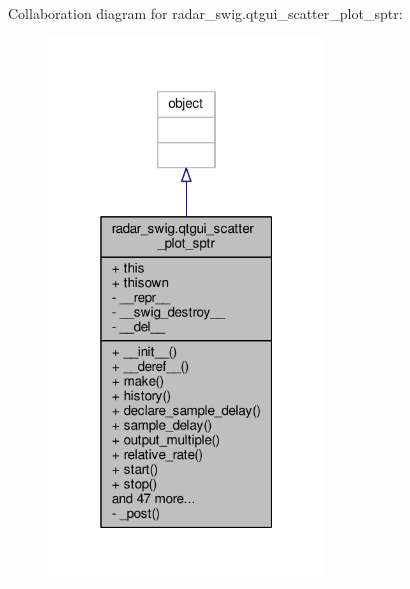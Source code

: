 Collaboration diagram for radar\+\_\+swig.\+qtgui\+\_\+scatter\+\_\+plot\+\_\+sptr\+:
\nopagebreak
\begin{figure}[H]
\begin{center}
\leavevmode
\includegraphics[width=208pt]{d6/ddb/classradar__swig_1_1qtgui__scatter__plot__sptr__coll__graph}
\end{center}
\end{figure}

